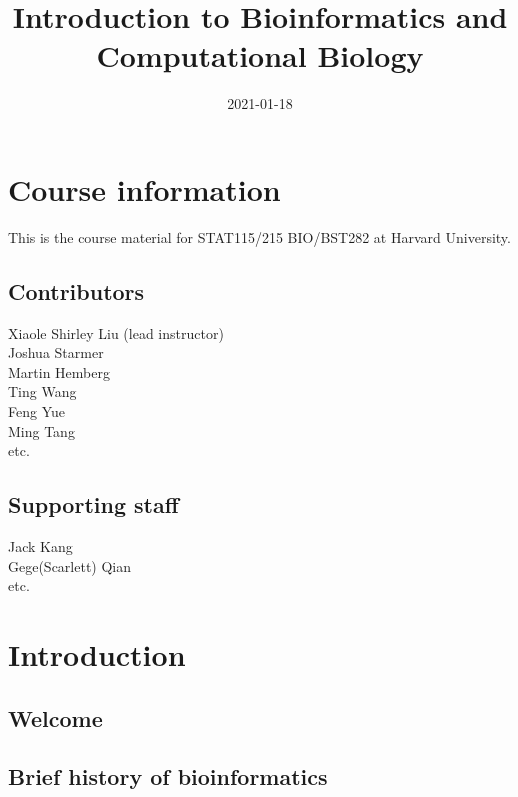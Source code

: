 \documentclass[]{book}
\title{Introduction to Bioinformatics and Computational Biology}
\author{}
\date{\vspace{-2.5em}2021-01-18}
\begin{document}
\maketitle

{
\setcounter{tocdepth}{1}
\tableofcontents
}
\hypertarget{course-information}{%
\chapter{Course information}\label{course-information}}

This is the course material for STAT115/215 BIO/BST282 at Harvard University.

\hypertarget{contributors}{%
\section{Contributors}\label{contributors}}

Xiaole Shirley Liu (lead instructor)\\
Joshua Starmer\\
Martin Hemberg\\
Ting Wang\\
Feng Yue\\
Ming Tang\\
etc.

\hypertarget{supporting-staff}{%
\section{Supporting staff}\label{supporting-staff}}

Jack Kang\\
Gege(Scarlett) Qian\\
etc.

\hypertarget{intro}{%
\chapter{Introduction}\label{intro}}

\hypertarget{welcome}{%
\section{Welcome}\label{welcome}}

\hypertarget{brief-history-of-bioinformatics}{%
\section{Brief history of bioinformatics}\label{brief-history-of-bioinformatics}}
\end{document}

